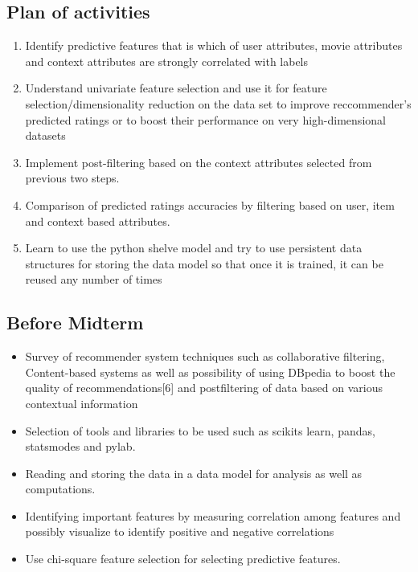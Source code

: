 \documentclass{article}
\begin{document}
\subsection{Plan of activities}

\begin{enumerate}
\item Identify predictive features that is which of user attributes, movie attributes and context attributes are strongly correlated with labels
\item Understand univariate feature selection and use it for feature selection/dimensionality reduction on the data set to improve reccommender's predicted ratings or to boost their performance on very high-dimensional datasets
\item Implement post-filtering based on the context attributes selected from previous two steps. 
\item Comparison of predicted ratings accuracies by filtering based on user, item and context based attributes. 
\item Learn to use the python shelve model and try to use persistent data structures for storing the data model so that once it is trained, it can be reused any number of times
\end{enumerate}

\subsection{Before Midterm}
\begin{itemize}
\item Survey of recommender system techniques such 
as collaborative filtering, Content-based systems 
as well as possibility of using DBpedia to boost 
the quality of recommendations[6] and postfiltering of data based on various contextual 
information
\item Selection of tools and libraries to be used such as 
scikits learn, pandas, statsmodes and pylab.
\item Reading and storing the data in a data model for analysis as well as computations.
\item Identifying important features by measuring 
correlation among features and possibly visualize 
to identify positive and negative correlations
\item Use chi-square feature selection for  selecting 
predictive features.
\end{itemize}
\end{document}
